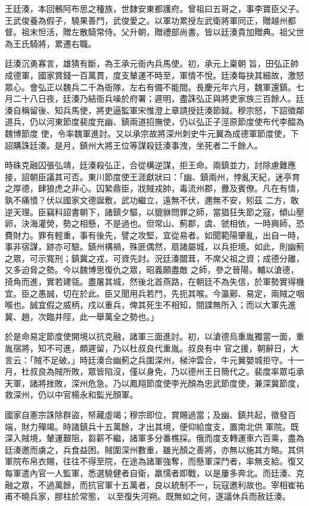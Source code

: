 \begin{pinyinscope}
 王廷湊，本回鶻阿布思之種族，世隸安東都護府。曾祖曰五哥之，事李寶臣父子。王武俊養為假子，驍果善鬥，武俊愛之。以軍功累授左武衛將軍同正，贈越州都督。祖末怛活，贈左散騎常侍。父升朝，贈禮部尚書。皆以廷湊貴加贈典。祖父世為王氏騎將，累遷右職。



 廷湊沉勇寡言，雄猜有斷，為王承元衙內兵馬使。初，承元上稟朝
 旨，田弘正帥成德軍，國家賞錢一百萬貫，度支輦運不時至，軍情不悅。廷湊每抉其細故，激怒眾心。會弘正以魏兵二千為衙隊，左右有備不能間。長慶元年六月，魏軍還鎮。七月二十八日夜，廷湊乃結衙兵噪於府署；遲明，盡誅弘正與將吏家族三百餘人。廷湊自稱留後、知兵馬使，將吏逼監軍宋惟澄上章請授廷湊節鉞。穆宗怒，下詔徵鄰道兵，仍以河東節度裴度充幽、鎮兩道招撫使，仍以弘正子涇原節度使布代李醖為魏博節度
 使，令率魏軍進討。又以承宗故將深州刺史牛元翼為成德軍節度使，下詔購誅廷湊。是月，鎮州大將王位等謀殺廷湊事洩，坐死者二千餘人。



 時硃克融囚張弘靖，廷湊殺弘正，合從構逆謀，拒王命。兩鎮並力，討除慮難應接，詔朝臣議其可否。東川節度使王涯獻狀曰：「幽、鎮兩州，悖亂天紀，迷亭育之厚德，肆狼虎之非心。囚縶鼎臣，戕賊戎帥，毒流州郡，釁及賓僚。凡在有情，孰不痛憤？伏以國家文德誕敷，武功繼立，遠無不伏，邇無不安，矧茲
 二方，敢逆天理。臣竊料詔書朝下，諸鎮夕驅，以貔貅問罪之師，當猖狂失節之寇，傾山壓卵，決海灌熒，勢之相懸，不是過也。但常山、薊郡，虞、虢相依，一時興師，恐費財力。罪有輕重，事有後先，譬之攻堅，宜從易者。如聞範陽肇亂，出自一時，事非宿謀，跡亦可驗。鎮州構禍，殊匪偶然，扇諸屬城，以兵拒境。如此，則幽薊之眾，可示寬刑；鎮冀之戎，可資先討。況廷湊闒茸，不席父祖之資；成德分離，又多迫脅之勢。今以魏博思復仇之眾，昭義願盡敵
 之師，參之晉陽，輔以滄德，掎角而進，實若建瓴。盡屠其城，然後北首燕路，在朝廷不為失信，於軍勢實得機宜。臣之愚誠，切在於此。臣又聞用兵若鬥，先扼其喉。今瀛鄚、易定，兩賊之咽喉也。誠宜假之威柄，戍以重兵，俾其死生不相知，間諜無所入；而以大軍先進冀、趙，次臨井陘，此一舉萬全之勢也。」



 於是命易定節度使開境以抗克融，諸軍三面進討。初，以滄德烏重胤獨當一面，重胤宿將，知不可進，頗遲留，乃以杜叔良代重胤。叔良有中
 官之援，朝辭日，大言云：「賊不足破。」時廷湊合幽薊之兵圍深州，梯沖雲合，牛元翼嬰城拒守。十一月，杜叔良為賊所敗，眾皆陷沒，僅以身免，乃以德州王日簡代之。裴度率眾屯承天軍，諸將挫敗，深州危急。乃以鳳翔節度使李光顏為忠武節度使，兼深冀節度，救深州，仍以中官楊永和監光顏軍。



 國家自憲宗誅除群盜，帑藏虛竭；穆宗即位，賞賜過當；及幽、鎮共起，徵發百端，財力殫竭。時諸鎮兵十五萬餘，才出其境，便仰給度支，置南北供
 軍院。既深入賊境，輦運艱阻，芻薪不繼，諸軍多分番樵採。俄而度支轉運車六百乘，盡為廷湊邀而虜之，兵食益困。賊圍深州數重，雖光顏之善將，亦無以施其方略。其供軍院布帛衣賜，往往不得至院，在途為諸軍強奪，而懸軍深鬥者，率無支給。復又每軍遣內官一人監軍，悉選驍健者自衛，羸懦者即戰，以是屢多奔北。而廷湊、克融之眾，不過萬餘，而抗官軍十五萬者，良以統制不一，玩寇邀利故也。宰相崔祐甫不曉兵家，膠柱於常態，
 以至復失河朔。既無如之何，遂議休兵而赦廷湊。




\end{pinyinscope}
